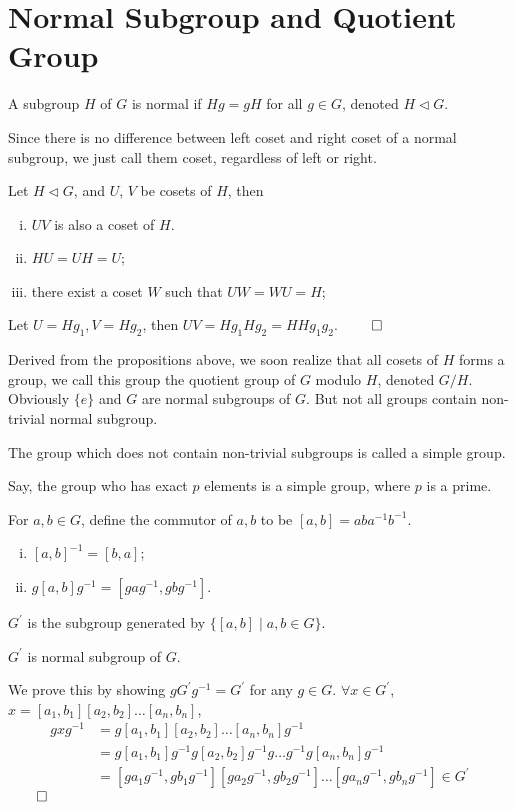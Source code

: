 \section{Normal Subgroup and Quotient Group}
\begin{defi}
A subgroup $H$ of $G$ is normal if $Hg = gH$ for all $g \in G$, denoted $H \lhd G$.
\end{defi}
Since there is no difference between left coset and right coset of a normal subgroup, we just call them coset, regardless of left or right.
\begin{pro}
Let $H \lhd G$, and $U$, $V$ be cosets of $H$, then
\begin{enumerate}[i).]
\item $UV$ is also a coset of $H$.
\item $HU=UH=U$;
\item there exist a coset $W$ such that $UW=WU=H$;
\end{enumerate}
\end{pro}
\begin{prf}
Let $U = Hg_1, V = Hg_2$, then $UV = Hg_1Hg_2 = HHg_1g_2$. $\qed$
\end{prf}
Derived from the propositions above, we soon realize that all cosets of $H$ forms a group, we call this group the quotient group of $G$ modulo $H$, denoted $G/H$.
Obviously $\{e\}$ and $G$ are normal subgroups of $G$. But not all groups contain non-trivial normal subgroup.
\begin{defi}
The group which does not contain non-trivial subgroups is called a simple group.
\end{defi}
Say, the group who has exact $p$ elements is a simple group, where $p$ is a prime.
\begin{defi}
For $a, b \in G$, define the commutor of $a, b$ to be $[a,b]=aba^{-1}b^{-1}$.
\end{defi}
\begin{pro}
\begin{enumerate}[i).]
\item $[a,b]^{-1}=[b,a]$;
\item $g[a,b]g^{-1}=[gag^{-1},gbg^{-1}]$.
\end{enumerate}
\end{pro}
\begin{defi}
$G^\prime$ is the subgroup generated by $\{[a,b] \mid a, b \in G\}$.
\end{defi}
\begin{thm}
$G^\prime$ is normal subgroup of $G$.
\end{thm}
\begin{prf}
We prove this by showing $gG^\prime g^{-1} = G^\prime$ for any $g \in G$.
$\forall x \in G^\prime$, $x = [a_1, b_1][a_2, b_2] \dots [a_n, b_n]$,
\begin{align}
gxg^{-1}
&= g[a_1, b_1][a_2, b_2] \dots [a_n, b_n]g^{-1} \nonumber\\
&= g[a_1, b_1]g^{-1}g[a_2, b_2]g^{-1}g \dots g^{-1}g[a_n, b_n]g^{-1} \nonumber\\
&= [ga_1g^{-1}, gb_1g^{-1}][ga_2g^{-1}, gb_2g^{-1}] \dots [ga_ng^{-1}, gb_ng^{-1}] \in G^\prime \nonumber
\end{align}
$\qed$
\end{prf}


